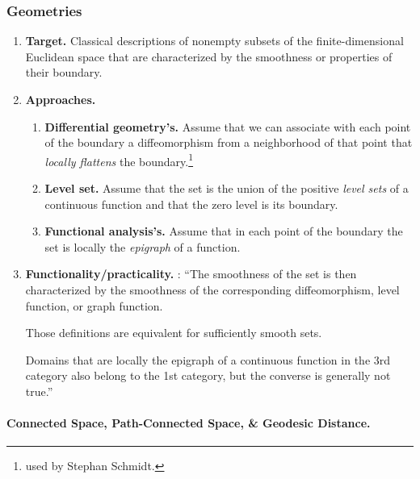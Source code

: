 \documentclass{book}
\numberwithin{equation}{section}
\begin{document}
\subsubsection{Geometries}
\begin{enumerate}
    \item \textbf{Target.} Classical descriptions of nonempty subsets of the finite-dimensional Euclidean space that are characterized by the smoothness or properties of their boundary.
    \item \textbf{Approaches.}
    \begin{enumerate}
        \item \textbf{Differential geometry's.} Assume that we can associate with each point of the boundary a diffeomorphism from a neighborhood of that point that \textit{locally flattens} the boundary.\footnote{used by Stephan Schmidt.}
        \item \textbf{Level set.} Assume that the set is the union of the positive \textit{level sets} of a continuous function and that the zero level is its boundary.
        \item \textbf{Functional analysis's.} Assume that in each point of the boundary the set is locally the \textit{epigraph} of a function.
    \end{enumerate}
    \item \textbf{Functionality/practicality.} \cite{Delfour_Zolesio2011}: ``The smoothness of the set is then characterized by the smoothness of the corresponding diffeomorphism, level function, or graph function.
    
    Those definitions are equivalent for sufficiently smooth sets.
    
    Domains that are locally the epigraph of a continuous function in the 3rd category also belong to the 1st category, but the converse is generally not true.''
\end{enumerate}

\paragraph{Connected Space, Path-Connected Space, \& Geodesic Distance.}
\end{document}
